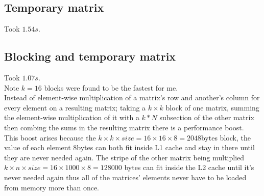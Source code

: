 \documentclass[10pt,a4paper]{article}
\begin{document}
    \subsection{Temporary matrix}
    Took $1.54s$.
    \subsection{Blocking and temporary matrix}
    Took $1.07s$.\\
    Note $k=16$ blocks were found to be the fastest for me.\\
    Instead of element-wise multiplication of a matrix's row and another's column for every element on a resulting matrix; taking a $k\times k$ block of one matrix, summing the element-wise multiplication of it with a $k*N$ subsection of the other matrix then combing the sums in the resulting matrix there is a performance boost.\\
    This boost arises because the $k\times k\times size=16\times 16\times 8=2048$bytes block, the value of each element $8$bytes can both fit inside L1 cache and stay in there until they are never needed again. The stripe of the other matrix being multiplied $k\times n\times size=16\times 1000\times 8=128000$ bytes can fit inside the L2 cache until it's never needed again thus all of the matrices' elements never have to be loaded from memory more than once.
\end{document}

